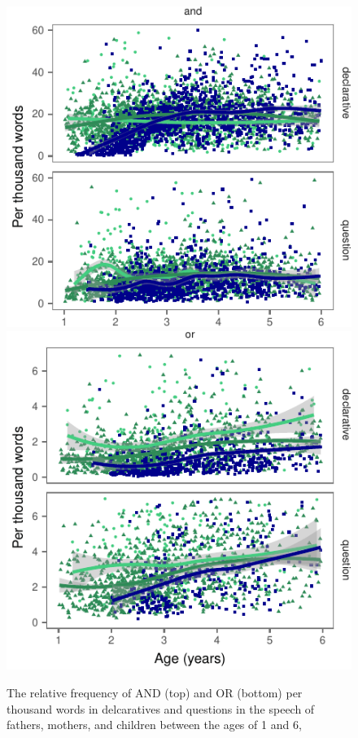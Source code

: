 \documentclass[10pt, letterpaper]{article}
\newenvironment{CodeChunk}{}{}
\begin{document}
\begin{CodeChunk}
\begin{figure}[H]
\includegraphics{figs/byspeechActPlots-1} \includegraphics{figs/byspeechActPlots-2} \caption[The relative frequency of AND (top) and OR (bottom) per thousand words in delcaratives and questions in the speech of fathers, mothers, and children between the ages of 1 and 6,]{The relative frequency of AND (top) and OR (bottom) per thousand words in delcaratives and questions in the speech of fathers, mothers, and children between the ages of 1 and 6,}\label{fig:byspeechActPlots}
\end{figure}
\end{CodeChunk}
\end{document}
